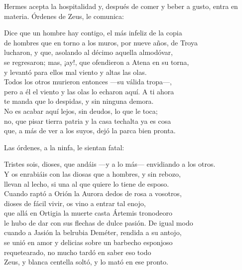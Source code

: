 Hermes acepta la hospitalidad y, después de comer y beber a gusto, entra en materia. Órdenes de Zeus, le comunica:

\begin{versocita}
Dice que un hombre hay contigo, el más infeliz de la copia\\
de hombres que en torno a los muros, por nueve años, de Troya\\
lucharon, y que, asolando al décimo aquella almodóvar,\\
se regresaron; mas, ¡ay!, que ofendieron a Atena en su torna,\\
y levantó para ellos mal viento y altas las olas.\\
Todos los otros murieron entonces ---su válida tropa---,\\
pero a él el viento y las olas lo echaron aquí. A ti ahora\\
te manda que lo despidas, y sin ninguna demora.\\
No es acabar aquí lejos, sin deudos, lo que le toca;\\
no, que pisar tierra patria y la casa techalta ya es cosa\\
que, a más de ver a los suyos, dejó la parca bien pronta.
\end{versocita}

Las órdenes, a la ninfa, le sientan fatal:

\begin{versocita}
Tristes sois, dioses, que andáis ---y a lo más--- envidiando a los otros.\\
Y os enrabiáis con las diosas que a hombres, y sin rebozo,\\
llevan al lecho, si una al que quiere lo tiene de esposo.\\
Cuando raptó a Orión la Aurora dedos de rosa a vosotros,\\
dioses de fácil vivir, os vino a entrar tal enojo,\\
que allá en Ortigia la muerte casta Ártemis tronodeoro\\
le hubo de dar con sus flechas de dulce pasión. De igual modo\\
cuando a Jasión la belrubia Deméter, rendida a su antojo,\\
se unió en amor y delicias sobre un barbecho esponjoso\\
requetearado, no mucho tardó en saber eso todo\\
Zeus, y blanca centella soltó, y lo mató en ese pronto.
\end{versocita}

